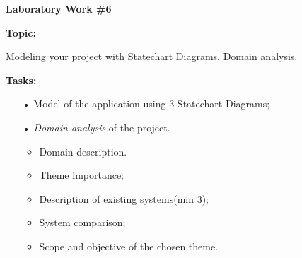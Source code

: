 \graphicspath{ {pic/} }
\begin{flushleft}
\setlength{\parindent}{2ex}\par
\textbf{Laboratory Work \#6} \par
\textbf{Topic:}\par
Modeling your project with Statechart Diagrams. Domain analysis.\par
\textbf{Tasks:}
\begin{enumerate}
\item[•] Model of the application using 3 Statechart Diagrams;
\item[•] \textit{Domain analysis} of the project.
\begin{itemize}
\item Domain description.
\item Theme importance;
\item Description of existing systems(min 3);
\item System comparison;
\item Scope and objective of the chosen theme.
\end{itemize}
\end{enumerate}
\end{flushleft}
\clearpage
